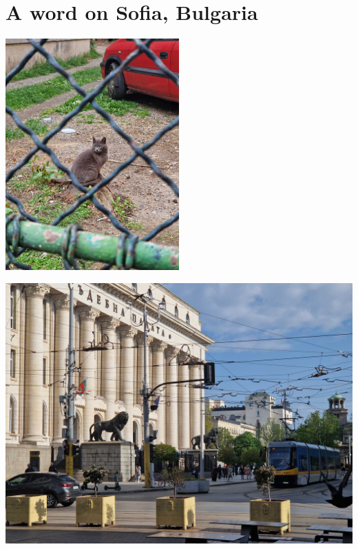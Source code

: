 \documentclass[11pt]{article}
\begin{document}
\section{A word on Sofia, Bulgaria}
\label{sec:orgfd6c064}

\begin{center}
\includegraphics[width=0.5\textwidth]{images/20230421_084129.jpg}
\end{center}

\begin{center}
\includegraphics[width=1.0\textwidth]{images/20230421_092159.jpg}
\end{center}
\end{document}
